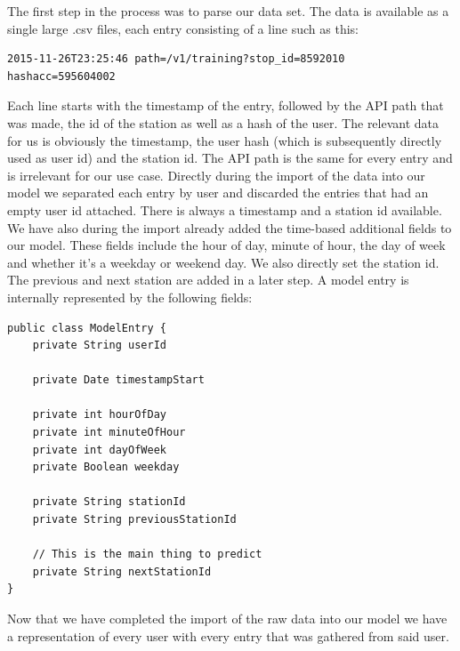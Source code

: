 The first step in the process was to parse our data set. The data is available as a single large .csv files, each entry consisting of a line such as this:
\begin{lstlisting}
2015-11-26T23:25:46	path=/v1/training?stop_id=8592010	hashacc=595604002
\end{lstlisting}
Each line starts with the timestamp of the entry, followed by the API path that was made, the id of the station as well as a hash of the user. The relevant data for us is obviously the timestamp, the user hash (which is subsequently directly used as user id) and the station id. The API path is the same for every entry and is irrelevant for our use case. Directly during the import of the data into our model we separated each entry by user and discarded the entries that had an empty user id attached. There is always a timestamp and a station id available. We have also during the import already added the time-based additional fields to our model. These fields include the hour of day, minute of hour, the day of week and whether it's a weekday or weekend day. We also directly set the station id. The previous and next station are added in a later step. A model entry is internally represented by the following fields:
\begin{lstlisting}
public class ModelEntry {
	private String userId
	
	private Date timestampStart
	
	private int hourOfDay
	private int minuteOfHour
	private int dayOfWeek
	private Boolean weekday
	
	private String stationId
	private String previousStationId
	
	// This is the main thing to predict
	private String nextStationId
}
\end{lstlisting}
Now that we have completed the import of the raw data into our model we have a representation of every user with every entry that was gathered from said user. 

